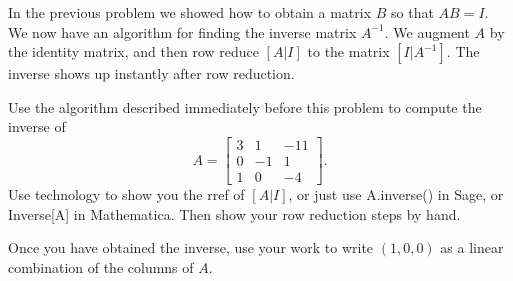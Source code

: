 In the previous problem we showed how to obtain a matrix $B$ so that $AB=I$. We now have an algorithm for finding the inverse matrix $A^{-1}$. We augment $A$ by the identity matrix, and then row reduce $[A|I]$ to the matrix $[I|A^{-1}]$.  The inverse shows up instantly after row reduction.


\begin{problem}
 Use the algorithm described immediately before this problem to compute the inverse of 
$$A=\begin{bmatrix}
 3 & 1 & -11 \\
 0 & -1 & 1 \\
 1 & 0 & -4
\end{bmatrix}.$$
Use technology to show you the rref of $[A|I]$, or just use A.inverse() in Sage, or Inverse[A] in Mathematica.  
Then show your row reduction steps by hand.

Once you have obtained the inverse, use your work to write $(1,0,0)$ as a linear combination of the columns of $A$.  
\end{problem}


\mysubsection{\ideaind}


